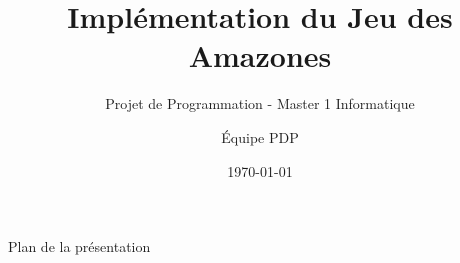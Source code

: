 \documentclass{beamer}
\title[Jeu des Amazones]{Implémentation du Jeu des Amazones}
\subtitle{Projet de Programmation - Master 1 Informatique}
\author{Équipe PDP}
\institute[Université de Bordeaux]{Université de Bordeaux}
\date{\today}
\begin{document}
\begin{frame}
    \titlepage
\end{frame}

\begin{frame}{Plan de la présentation}
    \tableofcontents
\end{frame}

\end{document}
